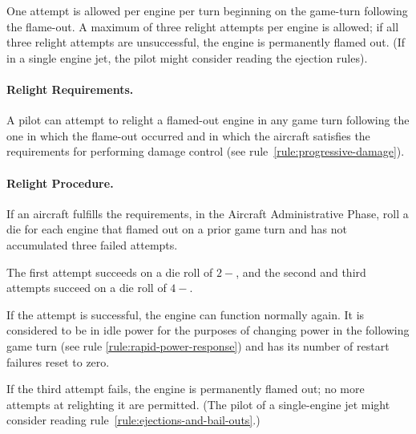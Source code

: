 \begin{advancedrules}
{One attempt is allowed per engine per turn beginning on the game-turn following the flame-out. A maximum of three relight attempts per engine is allowed; if all three relight attempts are unsuccessful, the engine is permanently flamed out. (If in a single engine jet, the pilot might consider reading the ejection rules).
}{
\paragraph{Relight Requirements.}
A pilot can attempt to relight a flamed-out engine in any game turn following the one in which the flame-out occurred and in which the aircraft satisfies the requirements for performing damage control (see rule~\ref{rule:progressive-damage}). 

\paragraph{Relight Procedure.}
If an aircraft fulfills the requirements, in the Aircraft Administrative Phase, roll a die for each engine that flamed out on a prior game turn and has not accumulated three failed attempts.

The first attempt succeeds on a die roll of $2-$, and the second and third attempts succeed on a die roll of $4-$. 

If the attempt is successful, the engine can function normally again. It is considered to be in idle power for the purposes of changing power in the following game turn (see rule \ref{rule:rapid-power-response}) and has its number of restart failures reset to zero. 

If the third attempt fails, the engine is permanently flamed out; no more attempts at relighting it are permitted. (The pilot of a single-engine jet might consider reading rule~\ref{rule:ejections-and-bail-outs}.)
}

\end{advancedrules}
